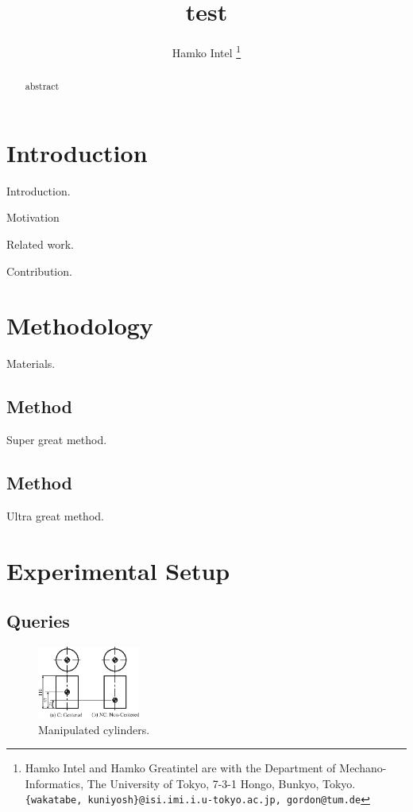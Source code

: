 \documentclass[letterpaper, 10 pt, conference]{IEEEtran}  %
\title{\LARGE \bf
    test
}
\author{Hamko Intel%
    \thanks{Hamko Intel and Hamko Greatintel are with the Department of Mechano-Informatics, The University of Tokyo, 7-3-1 Hongo, Bunkyo, Tokyo.  {\tt\small \{wakatabe, kuniyosh\}@isi.imi.i.u-tokyo.ac.jp, gordon@tum.de}}%

}
\begin{document}
\maketitle
\thispagestyle{empty}
\pagestyle{empty}

\begin{abstract}
abstract

\end{abstract}


\section{Introduction}
Introduction\cite{yingjie2005mld}.

Motivation

Related work.

Contribution.



\section{Methodology}
Materials.

\subsection{Method}
Super great method.

\subsection{Method}
Ultra great method.


\section{Experimental Setup}
\subsection{Queries}

\begin{figure}[t!]
 \centering
 \includegraphics[width=0.3\textwidth]{figure/cylinder-property.eps}
 \caption{Manipulated cylinders.} 
 \label{fig:cylinder}
\end{figure}
\end{document}
